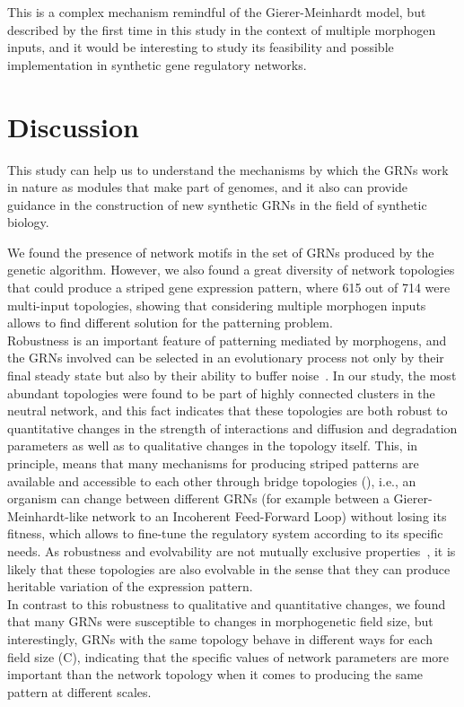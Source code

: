 \documentclass[10pt,letterpaper]{article}
\begin{document}
This is a complex mechanism remindful of the Gierer-Meinhardt model, but
described by the first time in this study in the context of multiple morphogen
inputs, and it would be interesting to study its feasibility and possible
implementation in synthetic gene regulatory networks.

\section*{Discussion}

This study can help us to understand the mechanisms by which the GRNs work in
nature as modules that make part of genomes, and it also can provide guidance
in the construction of new synthetic GRNs in the field of synthetic biology.

We found the presence of network motifs in the set of GRNs produced by the
genetic algorithm. However, we also found a great diversity of network
topologies that could produce a striped gene expression pattern, where 615 out of
714 were multi-input topologies, showing that considering multiple
morphogen inputs allows to find different solution for the patterning
problem.\\

Robustness is an important feature of patterning mediated by morphogens, and
the GRNs involved can be selected in an evolutionary process not only by their final
steady state but also by their ability to buffer noise~\cite{lo_robust_2015, exelby_2021}.
In our study, the most abundant topologies were
found to be part of highly connected clusters in the neutral network, and this fact
indicates that these topologies are both robust to quantitative changes in the
strength of interactions and diffusion and degradation parameters as well as to
qualitative changes in the topology itself. This, in principle, means that many
mechanisms for producing striped patterns are available and accessible to each
other through bridge topologies (), i.e.,
an organism can change between different GRNs (for example between
a Gierer-Meinhardt-like network to an Incoherent Feed-Forward Loop) without losing its
fitness, which allows to fine-tune the regulatory system according to its specific
needs. As robustness and evolvability are
not mutually exclusive properties~\cite{wagner_robustness_2008}, it is likely
that these topologies are also evolvable in the sense that they can produce
heritable variation of the expression pattern.\\

In contrast to this robustness to
qualitative and quantitative changes, we found that many GRNs were susceptible
to changes in morphogenetic field size, but interestingly, GRNs with the same
topology behave in different ways for each field size (C),
indicating that the specific values of network parameters are more important
than the network topology when it comes to producing the same pattern at
different scales.
\end{document}
